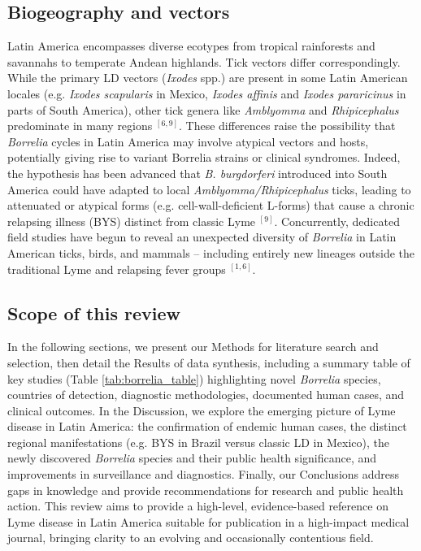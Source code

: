 \documentclass[11pt,letterpaper]{article}
\newcommand{\mycite}[1]{$^{[#1]}$}
\begin{document}
\subsection{Biogeography and vectors}
Latin America encompasses diverse ecotypes from tropical rainforests and savannahs to temperate Andean highlands. Tick vectors differ correspondingly. While the primary LD vectors (\textit{Ixodes} spp.) are present in some Latin American locales (e.g. \textit{Ixodes scapularis} in Mexico, \textit{Ixodes affinis} and \textit{Ixodes pararicinus} in parts of South America), other tick genera like \textit{Amblyomma} and \textit{Rhipicephalus} predominate in many regions \mycite{6, 9}. These differences raise the possibility that \textit{Borrelia} cycles in Latin America may involve atypical vectors and hosts, potentially giving rise to variant Borrelia strains or clinical syndromes. Indeed, the hypothesis has been advanced that \textit{B. burgdorferi} introduced into South America could have adapted to local \textit{Amblyomma/Rhipicephalus} ticks, leading to attenuated or atypical forms (e.g. cell-wall-deficient L-forms) that cause a chronic relapsing illness (BYS) distinct from classic Lyme \mycite{9}. Concurrently, dedicated field studies have begun to reveal an unexpected diversity of \textit{Borrelia} in Latin American ticks, birds, and mammals – including entirely new lineages outside the traditional Lyme and relapsing fever groups \mycite{1, 6}.

\subsection{Scope of this review}
In the following sections, we present our Methods for literature search and selection, then detail the Results of data synthesis, including a summary table of key studies (Table \ref{tab:borrelia_table}) highlighting novel \textit{Borrelia} species, countries of detection, diagnostic methodologies, documented human cases, and clinical outcomes. In the Discussion, we explore the emerging picture of Lyme disease in Latin America: the confirmation of endemic human cases, the distinct regional manifestations (e.g. BYS in Brazil versus classic LD in Mexico), the newly discovered \textit{Borrelia} species and their public health significance, and improvements in surveillance and diagnostics. Finally, our Conclusions address gaps in knowledge and provide recommendations for research and public health action. This review aims to provide a high-level, evidence-based reference on Lyme disease in Latin America suitable for publication in a high-impact medical journal, bringing clarity to an evolving and occasionally contentious field.
\end{document}
